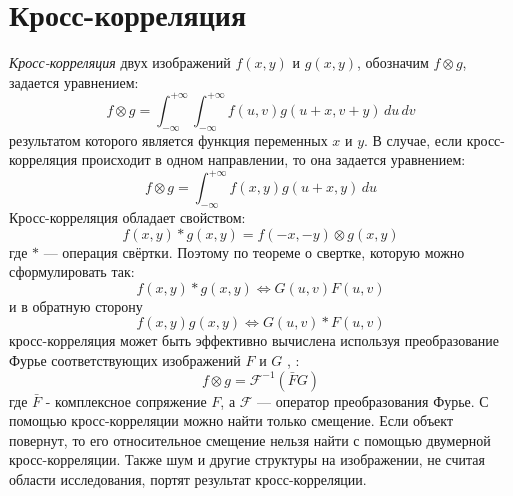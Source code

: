 \documentclass[oneside,final,14pt]{extreport}
\begin{document}
\section{Кросс-корреляция}
\emph{Кросс-корреляция} двух изображений \(f(x, y)\) и \(g(x, y)\), обозначим \(f \otimes g\),  задается уравнением: \begin{equation} f \otimes g = \int_{-\infty}^{+\infty}\int_{-\infty}^{+\infty}f(u,v)g(u+x, v+y)\,du\,dv \label{cor0} \end{equation} результатом которого является функция переменных  \(x\) и \(y\). В случае, если кросс-корреляция происходит в одном направлении, то она задается уравнением:  \begin{equation} f \otimes g = \int_{-\infty}^{+\infty}f(x,y)g(u+x,y)\,du \label{c} \end{equation}Кросс-корреляция обладает свойством:  \begin{equation} f(x,y) * g(x,y) = f(-x, -y) \otimes g(x, y)\end{equation} где \(*\) --- операция свёртки. Поэтому по теореме о свертке, которую можно сформулировать так: \[f(x,y) * g(x,y) \Longleftrightarrow G(u,v)F(u,v)\]
и в обратную сторону  \[f(x,y) g(x,y) \Longleftrightarrow G(u,v)*F(u,v)\]
кросс-корреляция может быть эффективно вычислена используя преобразование Фурье соответствующих изображений \(F\) и \(G\) \cite{gonzalez2002digital}, \cite{bracewell1986fourier} : \begin{equation} f  \otimes g = \mathcal{F}^{-1}(\bar{F} G) \label{cor} \end{equation}
где \(\bar F\) - комплексное сопряжение \(F\), а \(\mathcal{F}\)  --- оператор преобразования Фурье. С помощью кросс-корреляции можно найти только смещение. Если объект повернут, то его относительное смещение нельзя найти с помощью двумерной кросс-корреляции. Также шум и другие структуры на изображении, не считая области исследования, портят результат  кросс-корреляции.
\end{document}

